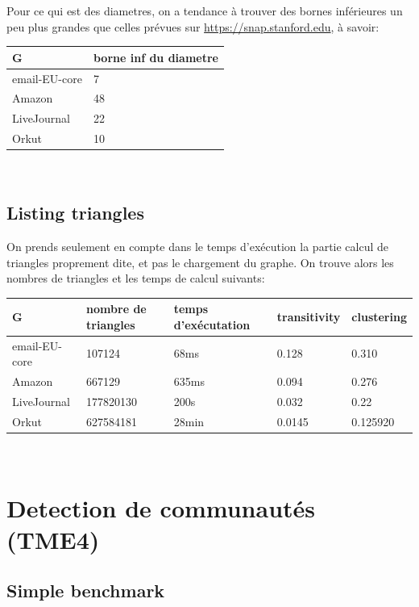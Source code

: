 \documentclass[a4paper]{report}
\begin{document}
Pour ce qui est des diametres, on a tendance à trouver des bornes inférieures un peu plus grandes que celles prévues sur \url{https://snap.stanford.edu}, à savoir:\\
\begin{tabular}{|l|l|}
  \hline
  G & borne inf du diametre \\
  \hline
  email-EU-core & 7\\
  Amazon & 48\\
  LiveJournal & 22\\
  Orkut & 10\\
  \hline
\end{tabular}\\

\section{Listing triangles}
On prends seulement en compte dans le temps d'exécution la partie calcul de triangles proprement dite, et pas le chargement du graphe. On trouve alors les nombres de triangles et les temps de calcul suivants:\\
\begin{tabular}{|l|l|l|l|l|}
  \hline
  G & nombre de triangles & temps d'exécutation & transitivity & clustering\\
  \hline
  email-EU-core & 107124 & 68ms & 0.128 & 0.310\\
  Amazon & 667129 & 635ms & 0.094 & 0.276\\
  LiveJournal & 177820130 & 200s & 0.032 & 0.22\\
  Orkut & 627584181 & 28min & 0.0145 & 0.125920\\
  \hline
\end{tabular}\\

\chapter{Detection de communautés (TME4)}

\section{Simple benchmark}
\end{document}
